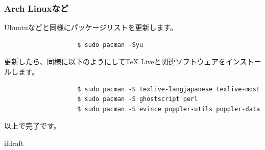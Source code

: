 			\subsubsection{Arch Linuxなど}
				Ubuntuなどと同様にパッケージリストを更新します。
				\begin{mdframed}[linecolor=black,linewidth=0.5pt]
					\begin{verbatim}
					$ sudo pacman -Syu
					\end{verbatim}
				\end{mdframed}
				更新したら、同様に以下のようにしてTeX Liveと関連ソフトウェアをインストールします。
				\begin{mdframed}[linecolor=black,linewidth=0.5pt]
					\begin{verbatim}
					$ sudo pacman -S texlive-langjapanese texlive-most
					$ sudo pacman -S ghostscript perl
					$ sudo pacman -S evince poppler-utils poppler-data
					\end{verbatim}
				\end{mdframed}
				以上で完了です。


				\expandafter\ifx\csname ifdraft\endcsname\relax

\fi